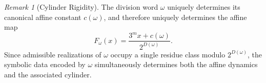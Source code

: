 \documentclass[12pt, oneside]{article}
\numberwithin{equation}{section}
\theoremstyle{definition}
\theoremstyle{plain}
\theoremstyle{remark}
\newtheorem*{remark}{Remark}
\begin{document}
\begin{remark}[Cylinder Rigidity]
The division word $\omega$ uniquely determines its canonical affine
constant $c(\omega)$, and therefore uniquely determines the affine map
\[
F_\omega(x) = \frac{3^m x+c(\omega)}{2^{D(\omega)}}.
\]
Since admissible realizations of $\omega$ occupy a single residue class
modulo $2^{D(\omega)}$, the symbolic data encoded by $\omega$
simultaneously determines both the affine dynamics and the associated
cylinder.
\end{remark}










\end{document}
